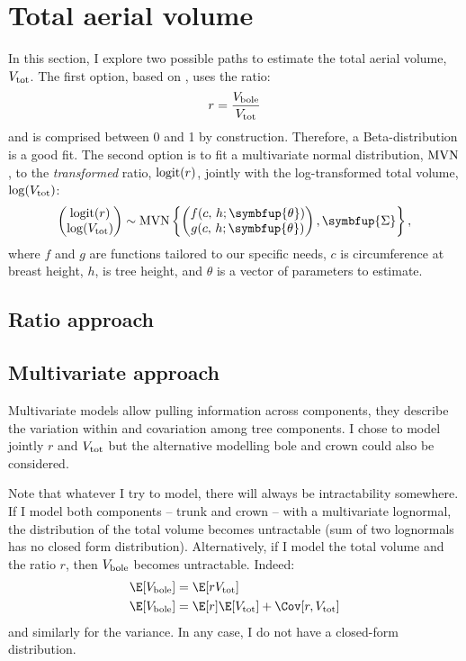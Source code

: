 \chapter{Total aerial volume\label{chap::total_v}}

In this section, I explore two possible paths to estimate the total aerial volume, \( V_{\text{tot}} \). The first option, based on \cite{Longuetaud2013}, uses the ratio:
\begin{equation}
	r = \frac{V_{\text{bole}}}{V_{\text{tot}}} \label{eq::r_boletot}
\end{equation}
and is comprised between 0 and 1 by construction. Therefore, a Beta-distribution is a good fit. The second option is to fit a multivariate normal distribution, \( \operatorname{MVN} \), to the \textit{transformed} ratio, \( \operatorname{logit}(r) \), jointly with the log-transformed total volume, \( \log(V_{\text{tot}}) \):
\begin{equation}
	\begin{pmatrix}
		\logit(r) \\
		\log(\Vtot)
	\end{pmatrix}
	\sim
	\MVN\left\{ \begin{pmatrix}
		f(c, \, h; \symbfup{\theta}) \\
		g(c, \, h; \symbfup{\theta}) \\
	\end{pmatrix}, \symbfup{\Sigma} \right\},
	\label{eq::mvn}
\end{equation}
where \( f \) and \( g \) are functions tailored to our specific needs, \( c \) is circumference at breast height, \( h \), is tree height, and \( \theta \) is a vector of parameters to estimate.

\section{Ratio approach}

\section{Multivariate approach}

Multivariate models allow pulling information across components, \ie they describe the variation within and covariation among tree components. I chose to model jointly \( r \) and \( V_{\text{tot}} \) but the alternative modelling bole and crown could also be considered.

\begin{tcolorbox}[breakable, title = Intractability]
Note that whatever I try to model, there will always be intractability somewhere. If I model both components -- trunk and crown -- with a multivariate lognormal, the distribution of the total volume becomes untractable (sum of two lognormals has no closed form distribution). Alternatively, if I model the total volume and the ratio \( r \), then \( V_{\text{bole}} \) becomes untractable. Indeed:
\begin{align*}
	\E[\Vbole] &= \E[r \Vtot] \\
	\E[\Vbole] &= \E[r] \E[\Vtot] + \Cov[r, \Vtot]
\end{align*}
and similarly for the variance. In any case, I do not have a closed-form distribution.
\end{tcolorbox}

